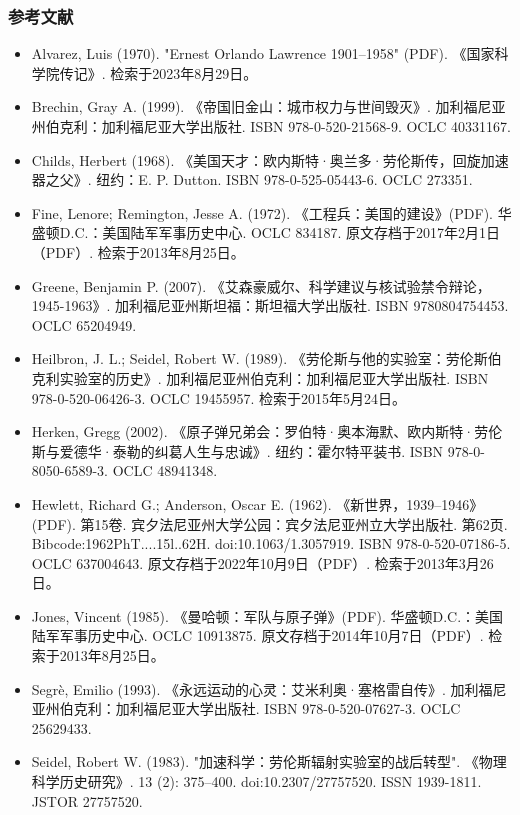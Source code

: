 \subsubsection{参考文献}
\begin{itemize}
\item Alvarez, Luis (1970). "Ernest Orlando Lawrence 1901–1958" (PDF). 《国家科学院传记》. 检索于2023年8月29日。
\item Brechin, Gray A. (1999). 《帝国旧金山：城市权力与世间毁灭》. 加利福尼亚州伯克利：加利福尼亚大学出版社. ISBN 978-0-520-21568-9. OCLC 40331167.
\item Childs, Herbert (1968). 《美国天才：欧内斯特·奥兰多·劳伦斯传，回旋加速器之父》. 纽约：E. P. Dutton. ISBN 978-0-525-05443-6. OCLC 273351.
\item Fine, Lenore; Remington, Jesse A. (1972). 《工程兵：美国的建设》(PDF). 华盛顿D.C.：美国陆军军事历史中心. OCLC 834187. 原文存档于2017年2月1日（PDF）. 检索于2013年8月25日。
\item Greene, Benjamin P. (2007). 《艾森豪威尔、科学建议与核试验禁令辩论，1945-1963》. 加利福尼亚州斯坦福：斯坦福大学出版社. ISBN 9780804754453. OCLC 65204949.
\item Heilbron, J. L.; Seidel, Robert W. (1989). 《劳伦斯与他的实验室：劳伦斯伯克利实验室的历史》. 加利福尼亚州伯克利：加利福尼亚大学出版社. ISBN 978-0-520-06426-3. OCLC 19455957. 检索于2015年5月24日。
\item Herken, Gregg (2002). 《原子弹兄弟会：罗伯特·奥本海默、欧内斯特·劳伦斯与爱德华·泰勒的纠葛人生与忠诚》. 纽约：霍尔特平装书. ISBN 978-0-8050-6589-3. OCLC 48941348.
\item Hewlett, Richard G.; Anderson, Oscar E. (1962). 《新世界，1939–1946》(PDF). 第15卷. 宾夕法尼亚州大学公园：宾夕法尼亚州立大学出版社. 第62页. Bibcode:1962PhT....15l..62H. doi:10.1063/1.3057919. ISBN 978-0-520-07186-5. OCLC 637004643. 原文存档于2022年10月9日（PDF）. 检索于2013年3月26日。
\item Jones, Vincent (1985). 《曼哈顿：军队与原子弹》(PDF). 华盛顿D.C.：美国陆军军事历史中心. OCLC 10913875. 原文存档于2014年10月7日（PDF）. 检索于2013年8月25日。
\item Segrè, Emilio (1993). 《永远运动的心灵：艾米利奥·塞格雷自传》. 加利福尼亚州伯克利：加利福尼亚大学出版社. ISBN 978-0-520-07627-3. OCLC 25629433.
\item Seidel, Robert W. (1983). "加速科学：劳伦斯辐射实验室的战后转型". 《物理科学历史研究》. 13 (2): 375–400. doi:10.2307/27757520. ISSN 1939-1811. JSTOR 27757520.
\end{itemize}
